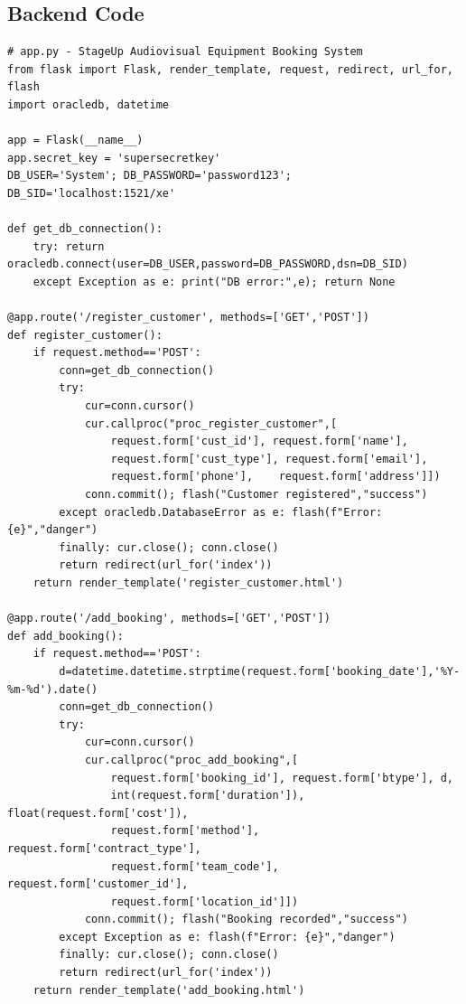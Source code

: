 \documentclass[12pt]{article}
\begin{document}
\subsection{Backend Code}

\begin{lstlisting}
# app.py - StageUp Audiovisual Equipment Booking System
from flask import Flask, render_template, request, redirect, url_for, flash
import oracledb, datetime

app = Flask(__name__)
app.secret_key = 'supersecretkey'
DB_USER='System'; DB_PASSWORD='password123'; DB_SID='localhost:1521/xe'

def get_db_connection():
    try: return oracledb.connect(user=DB_USER,password=DB_PASSWORD,dsn=DB_SID)
    except Exception as e: print("DB error:",e); return None

@app.route('/register_customer', methods=['GET','POST'])
def register_customer():
    if request.method=='POST':
        conn=get_db_connection()
        try:
            cur=conn.cursor()
            cur.callproc("proc_register_customer",[
                request.form['cust_id'], request.form['name'],
                request.form['cust_type'], request.form['email'],
                request.form['phone'],    request.form['address']])
            conn.commit(); flash("Customer registered","success")
        except oracledb.DatabaseError as e: flash(f"Error: {e}","danger")
        finally: cur.close(); conn.close()
        return redirect(url_for('index'))
    return render_template('register_customer.html')

@app.route('/add_booking', methods=['GET','POST'])
def add_booking():
    if request.method=='POST':
        d=datetime.datetime.strptime(request.form['booking_date'],'%Y-%m-%d').date()
        conn=get_db_connection()
        try:
            cur=conn.cursor()
            cur.callproc("proc_add_booking",[
                request.form['booking_id'], request.form['btype'], d,
                int(request.form['duration']), float(request.form['cost']),
                request.form['method'],       request.form['contract_type'],
                request.form['team_code'],    request.form['customer_id'],
                request.form['location_id']])
            conn.commit(); flash("Booking recorded","success")
        except Exception as e: flash(f"Error: {e}","danger")
        finally: cur.close(); conn.close()
        return redirect(url_for('index'))
    return render_template('add_booking.html')


\end{lstlisting}
\end{document}
